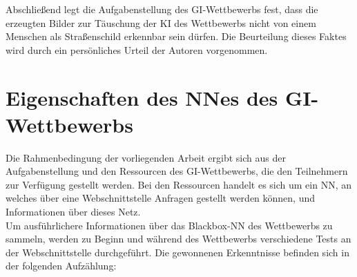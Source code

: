 Abschließend legt die Aufgabenstellung des \ac{GI}-Wettbewerbs fest, dass die erzeugten Bilder zur Täuschung der \ac{KI} des Wettbewerbs nicht von einem Menschen als Straßenschild erkennbar sein dürfen. 
Die Beurteilung dieses Faktes wird durch ein persönliches Urteil der Autoren vorgenommen.

\section{Eigenschaften des \acl{NN}es des \ac{GI}-Wettbewerbs}
\label{sec:EigenschaftenTrasi}
Die Rahmenbedingung der vorliegenden Arbeit ergibt sich aus der Aufgabenstellung und den Ressourcen des \ac{GI}-Wettbewerbs, die den Teilnehmern zur Verfügung gestellt werden. 
Bei den Ressourcen handelt es sich um ein \ac{NN}, an welches über eine Webschnittstelle Anfragen gestellt werden können, und Informationen über dieses Netz.\\
Um ausführlichere Informationen über das Blackbox-\ac{NN} des Wettbewerbs zu sammeln, werden zu Beginn und während des Wettbewerbs verschiedene Tests an der Webschnittstelle durchgeführt. 
Die gewonnenen Erkenntnisse befinden sich in der folgenden Aufzählung:

